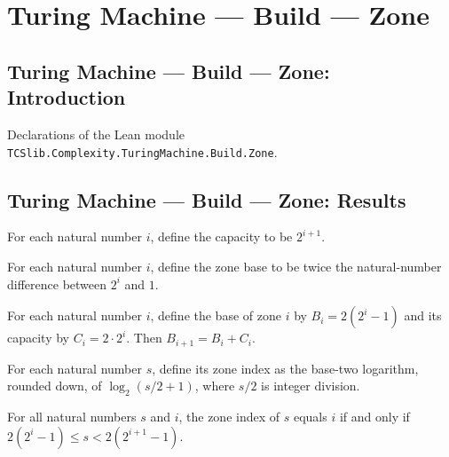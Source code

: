 \section{Turing Machine --- Build --- Zone}
\subsection*{Turing Machine --- Build --- Zone: Introduction}

Declarations of the Lean module \texttt{TCSlib.Complexity.TuringMachine.Build.Zone}.

\subsection*{Turing Machine --- Build --- Zone: Results}

\begin{definition}
\label{Turing.zoneCapacity}
\leanok
For each natural number $i$, define the capacity to be $2^{i+1}$.
\end{definition}

\begin{definition}
\label{Turing.zoneBase}
\leanok
For each natural number $i$, define the zone base to be twice the natural-number
difference between $2^i$ and $1$.
\end{definition}

\begin{theorem}
\label{Turing.zoneBase_succ}
\leanok
{}
For each natural number $i$, define the base of zone $i$ by $B_i=2(2^i-1)$ and its
capacity by $C_i=2\cdot 2^i$. Then $B_{i+1}=B_i+C_i$.
\end{theorem}

\begin{definition}
\label{Turing.zoneIndex}
\leanok
For each natural number $s$, define its zone index as the base-two logarithm, rounded
down, of $\log_2(s/2+1)$, where $s/2$ is integer division.
\end{definition}

\begin{theorem}
\label{Turing.zoneIndex_eq_iff}
\leanok
{}
For all natural numbers $s$ and $i$, the zone index of $s$ equals $i$ if and only if
$2(2^i-1)\le s<2(2^{i+1}-1)$.
\end{theorem}


